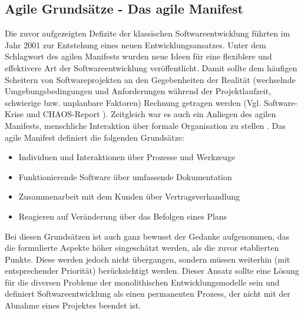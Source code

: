 \subsection{Agile Grundsätze - Das agile Manifest}
\label{Agile Grundsätze - Das agile Manifest}
Die zuvor aufgezeigten Defizite der klassischen Softwareentwicklung führten im Jahr 2001 zur Entstehung eines neuen Entwicklungsansatzes. Unter dem Schlagwort des agilen Manifests wurden neue Ideen für eine flexiblere und effektivere Art der Softwareentwicklung veröffentlicht. Damit sollte dem häufigen Scheitern von Softwareprojekten an den Gegebenheiten der Realität (wechselnde Umgebungsbedingungen und Anforderungen während der Projektlaufzeit, schwierige bzw. unplanbare Faktoren) Rechnung getragen werden (Vgl. \glqq{}Software-Krise\grqq{} und CHAOS-Report \cite{noauthor_standish_1995}). Zeitgleich war es auch ein Anliegen des agilen Manifests, menschliche Interaktion über formale Organisation zu stellen \cite{beck_manifest_2001}.
Das agile Manifest definiert die folgenden Grundsätze:
\begin{itemize}
    \item Individuen und Interaktionen über Prozesse und Werkzeuge
    \item Funktionierende Software über umfassende Dokumentation
    \item Zusammenarbeit mit dem Kunden über Vertragsverhandlung
    \item Reagieren auf Veränderung über das Befolgen eines Plans
\end{itemize}
Bei diesen Grundsätzen ist auch ganz bewusst der Gedanke aufgenommen, das die formulierte Aspekte höher eingeschätzt werden, als die zuvor etablierten Punkte. Diese werden jedoch nicht übergangen, sondern müssen weiterhin (mit entsprechender Priorität) berücksichtigt werden.
Dieser Ansatz sollte eine Lösung für die diversen Probleme der monolithischen Entwicklungsmodelle sein und definiert Softwareentwicklung als einen permanenten Prozess, der nicht mit der Abnahme eines Projektes beendet ist.